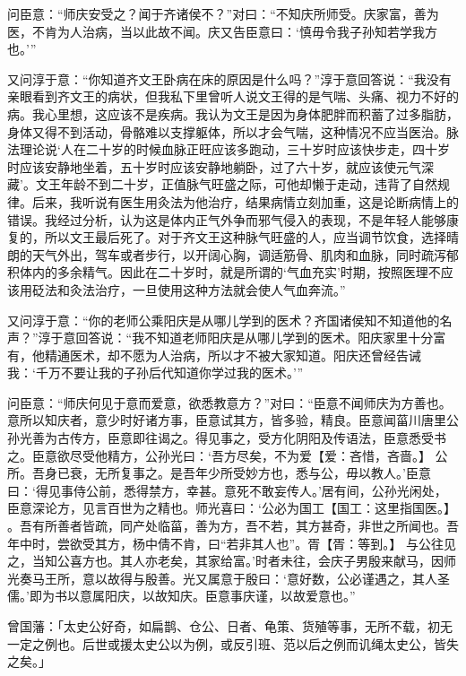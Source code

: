 \documentclass[12pt,UTF8]{ctexbook}
\begin{document}
问臣意：“师庆安受之？闻于齐诸侯不？”对曰：“不知庆所师受。庆家富，善为医，不肯为人治病，当以此故不闻。庆又告臣意曰：‘慎毋令我子孙知若学我方也。’”

又问淳于意：“你知道齐文王卧病在床的原因是什么吗？”淳于意回答说：“我没有亲眼看到齐文王的病状，但我私下里曾听人说文王得的是气喘、头痛、视力不好的病。我心里想，这应该不是疾病。我认为文王是因为身体肥胖而积蓄了过多脂肪，身体又得不到活动，骨骼难以支撑躯体，所以才会气喘，这种情况不应当医治。脉法理论说‘人在二十岁的时候血脉正旺应该多跑动，三十岁时应该快步走，四十岁时应该安静地坐着，五十岁时应该安静地躺卧，过了六十岁，就应该使元气深藏’。文王年龄不到二十岁，正值脉气旺盛之际，可他却懒于走动，违背了自然规律。后来，我听说有医生用灸法为他治疗，结果病情立刻加重，这是论断病情上的错误。我经过分析，认为这是体内正气外争而邪气侵入的表现，不是年轻人能够康复的，所以文王最后死了。对于齐文王这种脉气旺盛的人，应当调节饮食，选择晴朗的天气外出，驾车或者步行，以开阔心胸，调适筋骨、肌肉和血脉，同时疏泻郁积体内的多余精气。因此在二十岁时，就是所谓的‘气血充实’时期，按照医理不应该用砭法和灸法治疗，一旦使用这种方法就会使人气血奔流。”

又问淳于意：“你的老师公乘阳庆是从哪儿学到的医术？齐国诸侯知不知道他的名声？”淳于意回答说：“我不知道老师阳庆是从哪儿学到的医术。阳庆家里十分富有，他精通医术，却不愿为人治病，所以才不被大家知道。阳庆还曾经告诫我：‘千万不要让我的子孙后代知道你学过我的医术。’”

问臣意：“师庆何见于意而爱意，欲悉教意方？”对曰：“臣意不闻师庆为方善也。意所以知庆者，意少时好诸方事，臣意试其方，皆多验，精良。臣意闻菑川唐里公孙光善为古传方，臣意即往谒之。得见事之，受方化阴阳及传语法，臣意悉受书之。臣意欲尽受他精方，公孙光曰：‘吾方尽矣，不为爱【爱：吝惜，吝啬。】 公所。吾身已衰，无所复事之。是吾年少所受妙方也，悉与公，毋以教人。’臣意曰：‘得见事侍公前，悉得禁方，幸甚。意死不敢妄传人。’居有间，公孙光闲处，臣意深论方，见言百世为之精也。师光喜曰：‘公必为国工【国工：这里指国医。】 。吾有所善者皆疏，同产处临菑，善为方，吾不若，其方甚奇，非世之所闻也。吾年中时，尝欲受其方，杨中倩不肯，曰“若非其人也”。胥【胥：等到。】 与公往见之，当知公喜方也。其人亦老矣，其家给富。’时者未往，会庆子男殷来献马，因师光奏马王所，意以故得与殷善。光又属意于殷曰：‘意好数，公必谨遇之，其人圣儒。’即为书以意属阳庆，以故知庆。臣意事庆谨，以故爱意也。”


曾国藩：「太史公好奇，如扁鹊、仓公、日者、龟策、货殖等事，无所不载，初无一定之例也。后世或援太史公以为例，或反引班、范以后之例而讥绳太史公，皆失之矣。」
\end{document}
